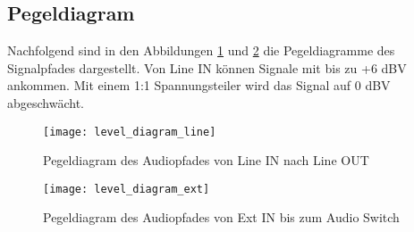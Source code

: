 \subsection{Pegeldiagram}
\label{sec:Pegeldiagram}

Nachfolgend sind in den Abbildungen \ref{pic:Pegeldiagram_Line} und \ref{pic:Pegeldiagram_Ext} die Pegeldiagramme des Signalpfades dargestellt.
Von Line IN können Signale mit bis zu +6 \si{dBV} ankommen. Mit einem 1:1 Spannungsteiler wird das Signal auf 0 \si{dBV} abgeschwächt.

\begin{figure}[H]
	\centering
	\texttt{[image: level\_diagram\_line]}
	\caption{Pegeldiagram des Audiopfades von Line IN nach Line OUT}
	\label{pic:Pegeldiagram_Line}
\end{figure}


\begin{figure}[H]
	\centering
	\texttt{[image: level\_diagram\_ext]}
	\caption{Pegeldiagram des Audiopfades von Ext IN bis zum Audio Switch}
	\label{pic:Pegeldiagram_Ext}
\end{figure}

